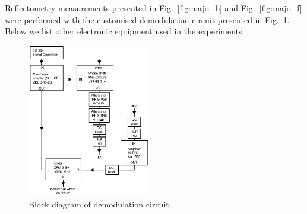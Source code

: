 Reflectometry measurements presented in Fig.~\ref{fig:majo_b} and Fig.~\ref{fig:majo_f} were performed with the customised demodulation circuit presented in Fig.~\ref{fig:majo_g}. Below we list other electronic equipment used in the experiments.

\begin{figure}
    \includegraphics[width=0.48\textwidth]{Fig7-0.pdf}
      \caption[Block diagram of demodulation circuit]{Block diagram of demodulation circuit.}
      \label{fig:majo_g}
\end{figure}

